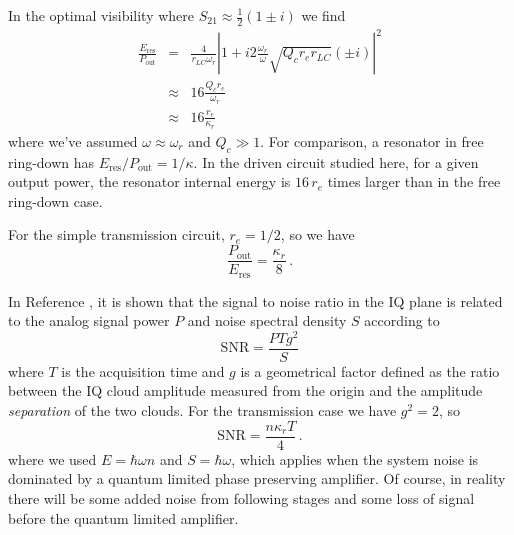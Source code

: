 In the optimal visibility where $S_{21}\approx\frac{1}{2}\left(1 \pm i \right)$ we find \begin{eqnarray}
\frac{E_{\text{res}}}{P_{\text{out}}} &=& \frac{4}{r_{LC}\omega_r}\left| 1 + i2\frac{\omega_r}{\omega} \sqrt{Q_c r_e r_{LC}}(\pm i) \right|^2 \nonumber \\
& \approx & 16 \frac{Q_c r_e }{\omega_r}\nonumber \\
& \approx & 16 \frac{r_e}{\kappa_r} \label{eq:sec:resonatorEnergyToOutputPowerRatio:ratio_lambda4_optimal} \end{eqnarray}
where we've assumed $\omega \approx \omega_r$ and $Q_c \gg 1$.
For comparison, a resonator in free ring-down has $E_{\text{res}}/P_{\text{out}} = 1/\kappa$.
In the driven circuit studied here, for a given output power, the resonator internal energy is $16 \, r_e$ times larger than in the free ring-down case.

For the simple transmission circuit, $r_e = 1/2$, so we have
\begin{equation*}
  \frac{P_\text{out}}{E_\text{res}} = \frac{\kappa_r}{8} \, .
\end{equation*}

In Reference \cite{Sank:demodulated_noise_stack_exchange}, it is shown that the signal to noise ratio in the IQ plane is related to the analog signal power $P$ and noise spectral density $S$ according to
\begin{equation}
  \text{SNR} = \frac{P T g^2}{S}
\end{equation}
where $T$ is the acquisition time and $g$ is a geometrical factor defined as the ratio between the IQ cloud amplitude measured from the origin and the amplitude \emph{separation} of the two clouds.
For the transmission case we have $g^2=2$, so
\begin{equation*}
  \text{SNR} = \frac{n \kappa_r T}{4} \, .
\end{equation*}
where we used $E = \hbar \omega n$ and $S = \hbar \omega$, which applies when the system noise is dominated by a quantum limited phase preserving amplifier.
Of course, in reality there will be some added noise from following stages and some loss of signal before the quantum limited amplifier.
